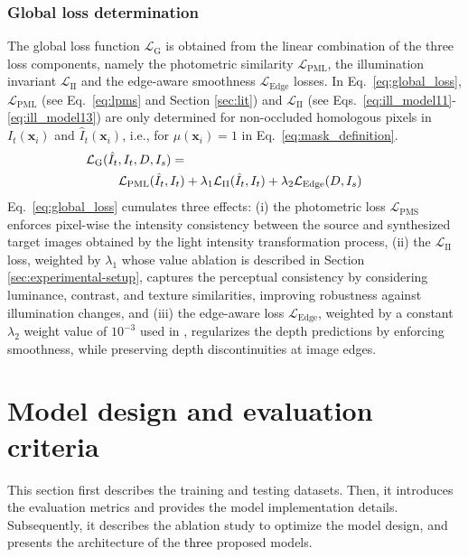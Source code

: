 \documentclass[a4paper,fleqn]{cas-dc}
\begin{document}
\subsubsection{Global loss determination}  
%
The global loss function $\mathcal{L}_{\textrm{G}}$ is obtained from the linear combination of the three loss components, namely the photometric similarity $\mathcal{L}_\textrm{PML}$, the illumination invariant $\mathcal{L}_\textrm{II}$ and the edge-aware smoothness $\mathcal{L}_{\textrm{Edge}}$ losses. In Eq.~\eqref{eq:global_loss}, $\mathcal{L}_\textrm{PML}$ (see Eq.~\eqref{eq:lpms} and Section \ref{sec:lit}) and $\mathcal{L}_\textrm{II}$ (see Eqs.~\eqref{eq:ill_model11}-\eqref{eq:ill_model13}) are only determined for non-occluded homologous pixels in $I_t(\mathbf{x}_i)$ and $\hat{I}_t(\mathbf{x}_i)$, i.e., for $\mu(\mathbf{x}_i) = 1$ in Eq.~\eqref{eq:mask_definition}. 
%
%
\begin{eqnarray} \label{eq:global_loss} \hspace{-6mm}
    \mathcal{L}_\textrm{G}(\hat{I}_{t},I_t,D, I_s) & = & \nonumber \\ & & \hspace{-22mm}
    \mathcal{L}_\textrm{PML}(\hat{I}_{t},I_t) + \lambda_1 \mathcal{L}_\textrm{II}(\hat{I}_t, I_t) + \lambda_2 \mathcal{L}_{\textrm{Edge}}(D, I_s)
\end{eqnarray}
%
%
Eq.~\eqref{eq:global_loss} cumulates three effects: (i) the photometric loss \( \mathcal{L}_{\text{PMS}} \) enforces pixel-wise the intensity consistency between the source and synthesized target images obtained by the light intensity transformation process, (ii) the  \( \mathcal{L}_\textrm{II} \) loss, weighted by \( \lambda_1 \) whose value ablation is described in Section \ref{sec:experimental-setup}, captures the perceptual consistency by considering luminance, contrast, and texture similarities, improving robustness against illumination changes, and (iii) the edge-aware loss \( \mathcal{L}_{\text{Edge}} \), weighted by a constant \( \lambda_2 \) weight value of \( 10^{-3} \) used in \citep{Godard_ICCV_2019,Shao_MIA_2022}, regularizes the depth predictions by enforcing smoothness, while preserving depth discontinuities at image edges.
%
%
\section{Model design and evaluation criteria\label{sec:experimental-setup}}
%
This section first describes the training and testing datasets. Then, it introduces the evaluation metrics and provides the model implementation details. Subsequently, it describes the ablation study to optimize the model design, and presents the architecture of the \textcolor{black}{three} proposed models.
%
\end{document}

